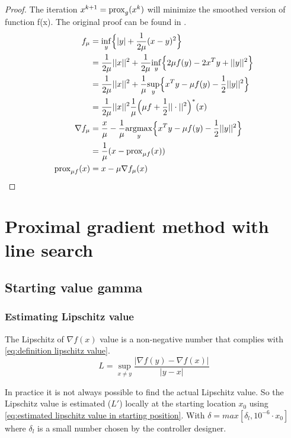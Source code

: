 		 \begin{proof}
		 	The iteration $x^{k+1}=\operatorname{prox}_g(x^k)$ will minimize the smoothed version of function f(x). The original proof can be found in \cite{QianYang}. 
		 	\begin{align*}
		 	f_{\mu}
		 	&= \underset{y}{\inf}\Big\{ |y| +\frac{1}{2 \mu}(x-y)^2 \Big\} \\
		 	&=   \frac{1}{2 \mu}||x||^2 + \frac{1}{2\mu} 
		 	\underset{y}{\inf}\Big\{
		 	2 \mu f(y) - 2x^T y + ||y||^2
		 	\Big\} \\
		 	&=  \frac{1}{2 \mu}||x||^2 + \frac{1}{\mu} 
		 	\underset{y}{\sup}\Big\{
		 	x^T y  - \mu f(y) - \frac{1}{2} ||y||^2 \Big \} \\
		 	&= \frac{1}{2\mu }||x||^2 \frac{1}{\mu } \Big( \mu f + \frac{1}{2}||\cdot||^2 \Big)^* (x) \\
		 	\nabla  f_{\mu} 
		 	&= \frac{x}{\mu} - \frac{1}{\mu} \underset{y}{\operatorname{argmax}} 
		 	\Big \{ x^Ty - \mu f(y) - \frac{1}{2}||y||^2 \Big \}\\
		 	& = \frac{1}{\mu}(x - \operatorname{prox}_{\mu f}(x)) \\
		 	\operatorname{prox}_{\mu f}(x)
		 	& = x- \mu \nabla f_{\mu}(x)
		 	\end{align*}
		 	\label{prf:proximal minimiztion alg proof}
		 \end{proof}	 

\section{Proximal gradient method with line search}
	\subsection{Starting value gamma }
		\subsubsection{Estimating Lipschitz value}
			The Lipschitz of $\nabla f(x)$ value is a non-negative number that complies with \eqref{eq:definition lipschitz value}.
			\begin{equation}
			L = \underset{x \neq y}{\sup} \frac{|\nabla f(y)-\nabla f(x)|}{|y-x|}
			\label{eq:definition lipschitz value}
			\end{equation}
			
			In practice it is not always possible to find the actual Lipschitz value. So the Lipschitz value is estimated ($L'$) locally at the starting location $x_0$ using \eqref{eq:estimated lipschitz value in starting position}. With $\delta=max[\delta_l,10^{-6} \cdot x_0]$ where $\delta_l$ is a small number chosen by the controller designer.
			
